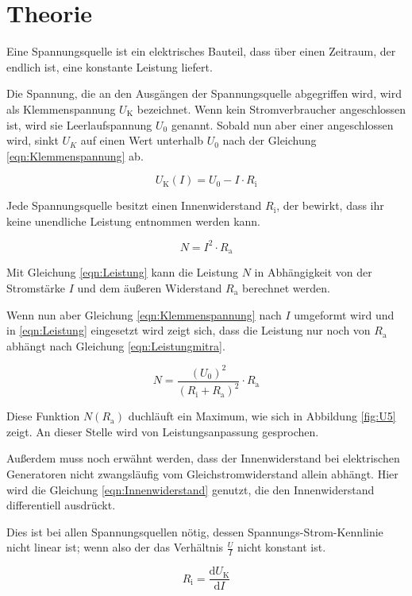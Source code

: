 \section{Theorie}
\label{sec:Theorie}

Eine Spannungsquelle ist ein elektrisches Bauteil, dass über einen Zeitraum, der endlich ist,
eine konstante Leistung liefert.

Die Spannung, die an den Ausgängen der Spannungsquelle abgegriffen wird, wird
als Klemmenspannung $U_\text{K}$ bezeichnet. Wenn kein Stromverbraucher angeschlossen ist, wird
sie Leerlaufspannung $U_\text{0}$ genannt. Sobald nun aber einer
angeschlossen wird, sinkt $U_K$ auf einen Wert unterhalb $U_\text{0}$ nach der Gleichung
\eqref{eqn:Klemmenspannung} ab.

\begin{equation}
  U_\text{K}(I) = U_\text{0} - I \cdot R_\text{i}
  \label{eqn:Klemmenspannung}
\end{equation}

Jede Spannungsquelle besitzt einen Innenwiderstand $R_\text{i}$, der bewirkt, dass
ihr keine unendliche Leistung entnommen werden kann.

\begin{equation}
  N = I^2 \cdot R_\text{a}
  \label{eqn:Leistung}
\end{equation}

Mit Gleichung \eqref{eqn:Leistung} kann die Leistung $N$ in Abhängigkeit von der Stromstärke $I$
und dem äußeren Widerstand $R_\text{a}$ berechnet werden.

Wenn nun aber Gleichung
\eqref{eqn:Klemmenspannung} nach $I$ umgeformt wird und in \eqref{eqn:Leistung} eingesetzt wird
zeigt sich, dass die Leistung nur noch von $R_\text{a}$ abhängt nach Gleichung
\eqref{eqn:Leistungmitra}.

\begin{equation}
  N = \frac{(U_\text{0})^2}{(R_\text{i} + R_\text{a})^2} \cdot R_\text{a}
  \label{eqn:Leistungmitra}
\end{equation}

Diese Funktion $N(R_\text{a})$ duchläuft ein Maximum, wie sich in Abbildung
\ref{fig:U5} zeigt. An dieser Stelle wird von Leistungsanpassung gesprochen.

Außerdem muss noch erwähnt werden, dass der Innenwiderstand bei elektrischen
Generatoren nicht zwangsläufig vom Gleichstromwiderstand allein abhängt. Hier
wird die Gleichung \eqref{eqn:Innenwiderstand} genutzt, die den Innenwiderstand
differentiell ausdrückt.

Dies ist bei allen Spannungsquellen nötig, dessen Spannungs-Strom-Kennlinie
nicht linear ist; wenn also der das Verhältnis $\frac{U}{I}$ nicht konstant ist.

\begin{equation}
  R_\text{i} = \frac{\text{d}U_\text{K}}{\text{d}I}
  \label{eqn:Innenwiderstand}
\end{equation}

\newpage
